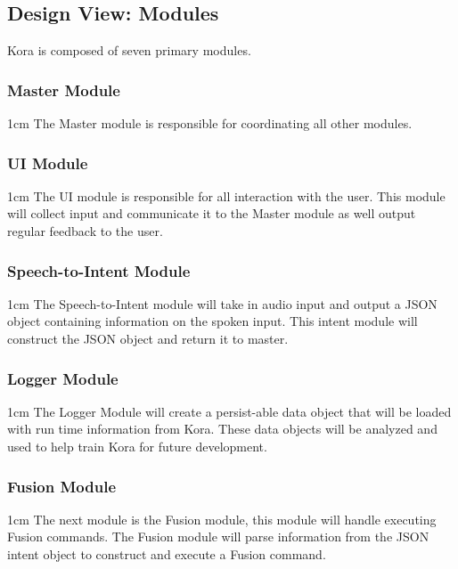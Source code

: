 \documentclass[onecolumn, draftclsnofoot,10pt, compsoc]{IEEEtran}
\def \botname{Kora\xspace}
\newenvironment{indentItem}[1][1cm]{\begin{adjustwidth}{#1}{}}{\end{adjustwidth}}
\begin{document}
    \subsection{Design View: Modules}
		\botname is composed of seven primary modules.
		\subsubsection{Master Module}
			\begin{indentItem}
				The Master module is responsible for coordinating all other modules.
			\end{indentItem}
		\subsubsection{UI Module}
			\begin{indentItem}
				The UI module is responsible for all interaction with the user.
				This module will collect input and communicate it to the Master module as well output regular feedback to the user.
			\end{indentItem}
		\subsubsection{Speech-to-Intent Module}
			\begin{indentItem}
				The Speech-to-Intent module will take in audio input and output a JSON object containing information on the spoken input.
				This intent module will construct the JSON object and return it to master.
			\end{indentItem}
		\subsubsection{Logger Module}
			\begin{indentItem}
				The Logger Module will create a persist-able data object that will be loaded with run time information from \botname.
				These data objects will be analyzed and used to help train \botname for future development.
			\end{indentItem}
		\subsubsection{Fusion Module}
			\begin{indentItem}
				The next module is the Fusion module, this module will handle executing Fusion commands.
				The Fusion module will parse information from the JSON intent object to construct and execute a Fusion command.
			\end{indentItem}
\end{document}
